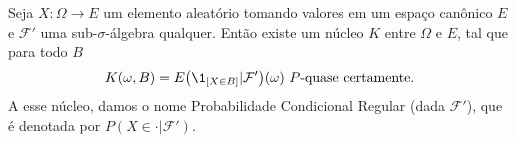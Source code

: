 
\begin{theorem}
  \label{t:prob_cond_reg_F}
  Seja $X: \Omega \to E$ um elemento aleatório tomando valores em um espaço canônico $E$ e $\mathcal{F}'$ uma sub-$\sigma$-álgebra qualquer.
  Então existe um núcleo $K$ entre $\Omega$ e $E$, tal que para todo $B$
  \begin{equation}
    K(\omega, B) = E\big(\1_{[X \in B]} | \mathcal{F}'\big) (\omega) \text{ $P$-quase certamente.}
  \end{equation}
  A esse núcleo, damos o nome Probabilidade Condicional Regular (dada $\mathcal{F}'$), que é denotada por $P(X \in \cdot|\mathcal{F}')$.
\end{theorem}


